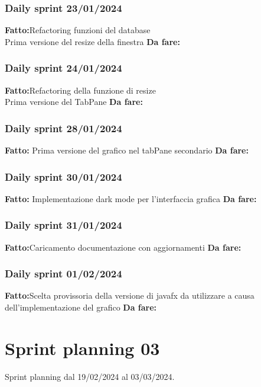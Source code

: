 \documentclass{report}
\begin{document}
\subsection{Daily sprint 23/01/2024}
\textbf{Fatto:}Refactoring funzioni del database\\
Prima versione del resize della finestra
\textbf{Da fare:} 
\subsection{Daily sprint 24/01/2024}
\textbf{Fatto:}Refactoring della funzione di resize\\
Prima versione del TabPane
\textbf{Da fare:} 
\subsection{Daily sprint 28/01/2024}
\textbf{Fatto:} Prima versione del grafico nel tabPane secondario
\textbf{Da fare:} 
\subsection{Daily sprint 30/01/2024}
\textbf{Fatto:}  Implementazione dark mode per l'interfaccia grafica
\textbf{Da fare:} 
\subsection{Daily sprint 31/01/2024}
\textbf{Fatto:}Caricamento documentazione con aggiornamenti
\textbf{Da fare:} 
\subsection{Daily sprint 01/02/2024}
\textbf{Fatto:}Scelta provissoria della versione di javafx da utilizzare a causa dell'implementazione del grafico
\textbf{Da fare:} 


\chapter{Sprint planning 03}
Sprint planning dal 19/02/2024 al 03/03/2024.\\
\end{document}
